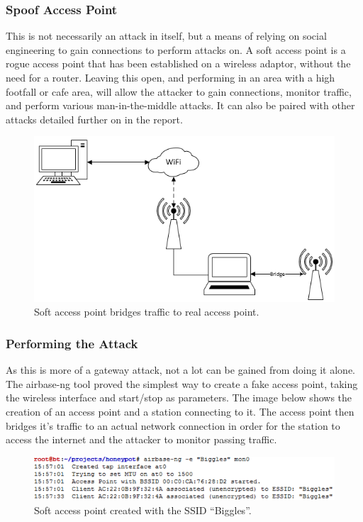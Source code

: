 \subsubsection{Spoof Access Point}
\label{sec:spoofap}
This is not necessarily an attack in itself, but a means of relying on social engineering to gain connections to perform attacks on. A soft access point is a rogue access point that has been established on a wireless adaptor, without the need for a router. Leaving this open, and performing in an area with a high footfall or cafe area, will allow the attacker to gain connections, monitor traffic, and perform various man-in-the-middle attacks. It can also be paired with other attacks detailed further on in the report.

\begin{figure}[h!]
\includegraphics[width=\linewidth]{research/figures/spoofap.png}
\caption{Soft access point bridges traffic to real access point.}
\end{figure}

\subsubsection*{Performing the Attack}
As this is more of a gateway attack, not a lot can be gained from doing it alone. The airbase-ng tool proved the simplest way to create a fake access point, taking the wireless interface and start/stop as parameters. The image below shows the creation of an access point and a station connecting to it. The access point then bridges it’s traffic to an actual network connection in order for the station to access the internet and the attacker to monitor passing traffic.

\begin{figure}[h!]
\includegraphics[width=\linewidth]{research/attackvectors/figures/spoofap1.png}
\caption{Soft access point created with the SSID “Biggles”.}
\end{figure}